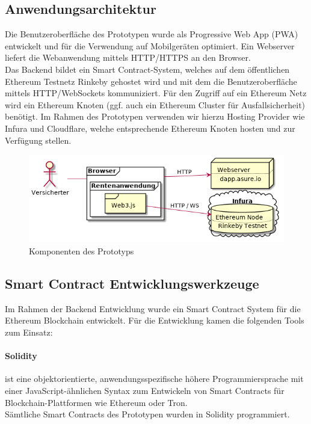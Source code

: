 \subsection{Anwendungsarchitektur}
Die Benutzeroberfläche des Prototypen wurde als Progressive Web App (PWA) entwickelt und für die Verwendung auf Mobilgeräten optimiert. Ein Webserver liefert die Webanwendung mittels HTTP/HTTPS an den Browser.
\\
Das Backend bildet ein Smart Contract-System, welches auf dem öffentlichen Ethereum Testnetz Rinkeby gehostet wird und mit dem die Benutzeroberfläche mittels HTTP/WebSockets kommuniziert. Für den Zugriff auf ein Ethereum Netz wird ein Ethereum Knoten (ggf. auch ein Ethereum Cluster für Ausfallsicherheit) benötigt. Im Rahmen des Prototypen verwenden wir hierzu Hosting Provider wie Infura und Cloudflare, welche entsprechende Ethereum Knoten hosten und zur Verfügung stellen.

\begin{figure}
    \centering
    \includegraphics[width=6.0in]{images/components.png}
    \caption{Komponenten des Prototyps}
\end{figure}


\subsection*{Smart Contract Entwicklungswerkzeuge}
Im Rahmen der Backend Entwicklung wurde ein Smart Contract System für die Ethereum Blockchain entwickelt. Für die Entwicklung kamen die folgenden Tools zum Einsatz:

\paragraph*{Solidity} ist eine objektorientierte, anwendungsspezifische höhere Programmiersprache mit einer JavaScript-ähnlichen Syntax zum Entwickeln von Smart Contracts für Blockchain-Plattformen wie Ethereum oder Tron.\\ %
Sämtliche Smart Contracts des Prototypen wurden in Solidity programmiert.

